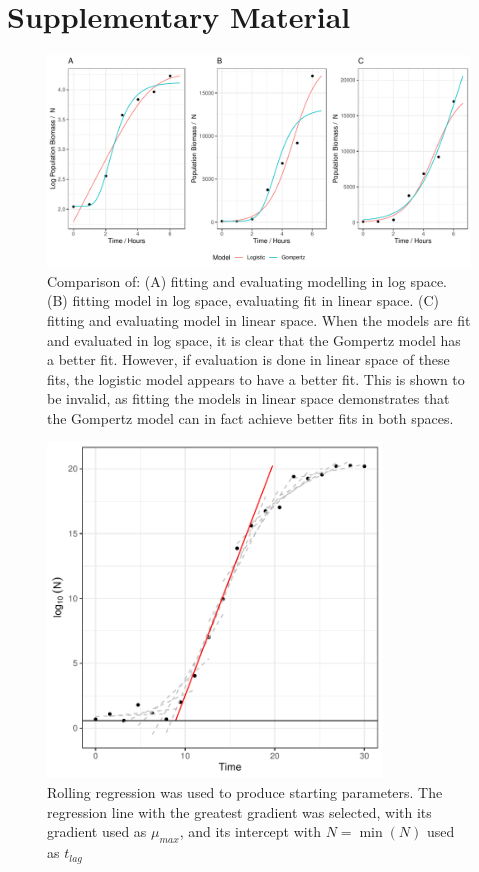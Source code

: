 \documentclass[11pt, a4paper]{article}
\newcommand{\beginsupplement}{%
        \setcounter{table}{0}
        \renewcommand{\thetable}{S\arabic{table}}%
        \setcounter{figure}{0}
        \renewcommand{\thefigure}{S\arabic{figure}}%
     }
\begin{document}
\section{Supplementary Material}
\beginsupplement

        \begin{figure}[H]
        \includegraphics[width=\linewidth]{../results/compare_log_lin_fit.pdf}
        \captionsetup{format=hang}
        \caption{Comparison of: (A) fitting and evaluating modelling in log space. (B) fitting model in log space, evaluating fit in linear space. (C) fitting and evaluating model in linear space. \newline When the models are fit and evaluated in log space, it is clear that the Gompertz model has a better fit. However, if evaluation is done in linear space of these fits, the logistic model appears to have a better fit. This is shown to be invalid, as fitting the models in linear space demonstrates that the Gompertz model can in fact achieve better fits in both spaces.  }
        \label{sup:compare_least_squares}
        \end{figure}
        
        
        \begin{figure}[H]
        \centering
        \includegraphics[width=3.5in]{../results/rolling_reg.pdf}
        \caption{Rolling regression was used to produce starting parameters. The regression line with the greatest gradient was selected, with its gradient used as $\mu_{max}$, and its intercept with $N = \min(N)$ used as $t_{lag}$ }
        \label{sup:rolling_regression}
        \end{figure}  
        
\end{document}
